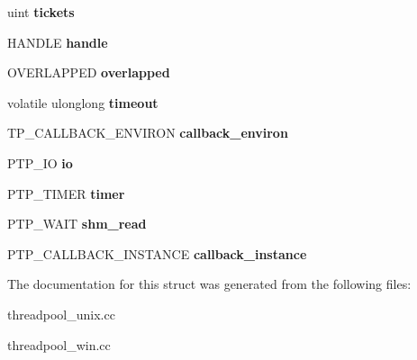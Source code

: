 \begin{DoxyCompactItemize}
$$uint {\bfseries tickets}
\item 
\mbox{\label{structconnection__t_a699af94a2d7688dc4704a47e873ae210}} 
H\+A\+N\+D\+LE {\bfseries handle}
\item 
\mbox{\label{structconnection__t_ac754d624729bf35b2320dd6123bacdac}} 
O\+V\+E\+R\+L\+A\+P\+P\+ED {\bfseries overlapped}
\item 
\mbox{\label{structconnection__t_a0960fb0bba5894adae52aab3e22f3f32}} 
volatile ulonglong {\bfseries timeout}
\item 
\mbox{\label{structconnection__t_a4d151e8879c4cc2e5b940e411c5d0368}} 
T\+P\+\_\+\+C\+A\+L\+L\+B\+A\+C\+K\+\_\+\+E\+N\+V\+I\+R\+ON {\bfseries callback\+\_\+environ}
\item 
\mbox{\label{structconnection__t_ad8c96fb2a8d2a709bed614c601bfe5dd}} 
P\+T\+P\+\_\+\+IO {\bfseries io}
\item 
\mbox{\label{structconnection__t_a4c63a974ec60e236d0fd6b8252882e54}} 
P\+T\+P\+\_\+\+T\+I\+M\+ER {\bfseries timer}
\item 
\mbox{\label{structconnection__t_af5758923fc2f679ae99422db83f0cfa8}} 
P\+T\+P\+\_\+\+W\+A\+IT {\bfseries shm\+\_\+read}
\item 
\mbox{\label{structconnection__t_aae7b4067ee3e1eb9da137c0081d60e17}} 
P\+T\+P\+\_\+\+C\+A\+L\+L\+B\+A\+C\+K\+\_\+\+I\+N\+S\+T\+A\+N\+CE {\bfseries callback\+\_\+instance}
\end{DoxyCompactItemize}


The documentation for this struct was generated from the following files\+:\begin{DoxyCompactItemize}
\item 
threadpool\+\_\+unix.\+cc\item 
threadpool\+\_\+win.\+cc\end{DoxyCompactItemize}
